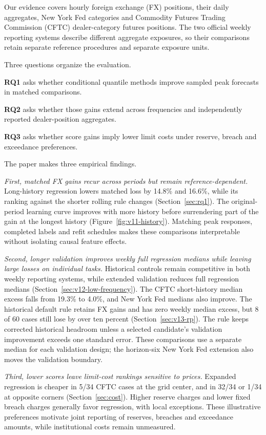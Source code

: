 \documentclass[11pt,a4paper]{article}
\begin{document}
Our evidence covers hourly foreign exchange (FX) positions, their daily aggregates, New York Fed categories and Commodity Futures Trading Commission (CFTC) dealer-category futures positions. The two official weekly reporting systems describe different aggregate exposures, so their comparisons retain separate reference procedures and separate exposure units.

Three questions organize the evaluation.

\textbf{RQ1} asks whether conditional quantile methods improve sampled peak forecasts in matched comparisons.

\textbf{RQ2} asks whether those gains extend across frequencies and independently reported dealer-position aggregates.

\textbf{RQ3} asks whether score gains imply lower limit costs under reserve, breach and exceedance preferences.

The paper makes three empirical findings.

\textit{First, matched FX gains recur across periods but remain reference-dependent.} Long-history regression lowers matched loss by 14.8\% and 16.6\%, while its ranking against the shorter rolling rule changes (Section~\ref{sec:rq1}). The original-period learning curve improves with more history before surrendering part of the gain at the longest history (Figure~\ref{fig:v11-history}). Matching peak responses, completed labels and refit schedules makes these comparisons interpretable without isolating causal feature effects.

\textit{Second, longer validation improves weekly full regression medians while leaving large losses on individual tasks.} Historical controls remain competitive in both weekly reporting systems, while extended validation reduces full regression medians (Section~\ref{sec:v12-low-frequency}). The CFTC short-history median excess falls from 19.3\% to 4.0\%, and New York Fed medians also improve. The historical default rule retains FX gains and has zero weekly median excess, but 8 of 60 cases still lose by over ten percent (Section~\ref{sec:v13-rp}). The rule keeps corrected historical headroom unless a selected candidate's validation improvement exceeds one standard error. These comparisons use a separate median for each validation design; the horizon-six New York Fed extension also moves the validation boundary.

\textit{Third, lower scores leave limit-cost rankings sensitive to prices.} Expanded regression is cheaper in 5/34 CFTC cases at the grid center, and in 32/34 or 1/34 at opposite corners (Section~\ref{sec:cost}). Higher reserve charges and lower fixed breach charges generally favor regression, with local exceptions. These illustrative preferences motivate joint reporting of reserves, breaches and exceedance amounts, while institutional costs remain unmeasured.
\end{document}
